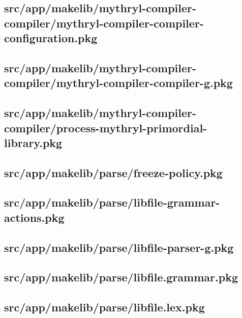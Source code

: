 \subsection{src/app/makelib/mythryl-compiler-compiler/mythryl-compiler-compiler-configuration.pkg}


\subsection{src/app/makelib/mythryl-compiler-compiler/mythryl-compiler-compiler-g.pkg}


\subsection{src/app/makelib/mythryl-compiler-compiler/process-mythryl-primordial-library.pkg}


\subsection{src/app/makelib/parse/freeze-policy.pkg}


\subsection{src/app/makelib/parse/libfile-grammar-actions.pkg}


\subsection{src/app/makelib/parse/libfile-parser-g.pkg}


\subsection{src/app/makelib/parse/libfile.grammar.pkg}


\subsection{src/app/makelib/parse/libfile.lex.pkg}


